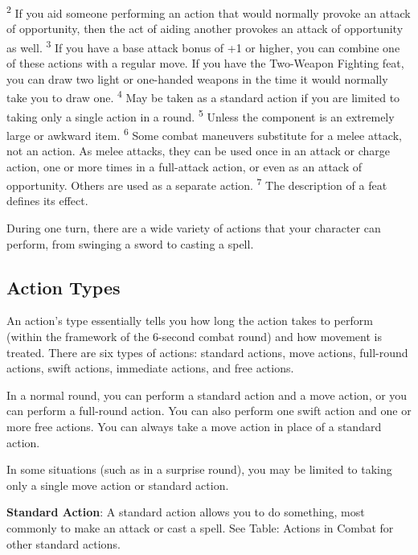 \begin{table}[]
\textsuperscript{2} If you aid someone performing an action that would normally provoke an attack of opportunity, then the act of aiding another provokes an attack of opportunity as well.\newline
\textsuperscript{3} If you have a base attack bonus of +1 or higher, you can combine one of these actions with a regular move. If you have the Two-Weapon Fighting feat, you can draw two light or one-handed weapons in the time it would normally take you to draw one.\newline
\textsuperscript{4} May be taken as a standard action if you are limited to taking only a single action in a round.\newline
\textsuperscript{5} Unless the component is an extremely large or awkward item.\newline
\textsuperscript{6} Some combat maneuvers substitute for a melee attack, not an action. As melee attacks, they can be used once in an attack or charge action, one or more times in a full-attack action, or even as an attack of opportunity. Others are used as a separate action.\newline
\textsuperscript{7} The description of a feat defines its effect.
\end{table}

				
During one turn, there are a wide variety of actions that your character can perform, from swinging a sword to casting a spell.
				
\subsection{Action Types}

				
An action's type essentially tells you how long the action takes to perform (within the framework of the 6-second combat round) and how movement is treated. There are six types of actions: standard actions, move actions, full-round actions, swift actions, immediate actions, and free actions.
				
In a normal round, you can perform a standard action and a move action, or you can perform a full-round action. You can also perform one swift action and one or more free actions. You can always take a move action in place of a standard action.
				
In some situations (such as in a surprise round), you may be limited to taking only a single move action or standard action.
				
\textbf{Standard Action}: A standard action allows you to do something, most commonly to make an attack or cast a spell. See Table: Actions in Combat for other standard actions.
				
